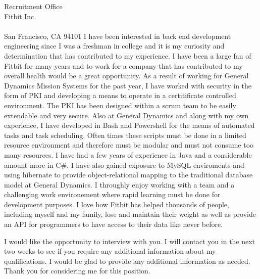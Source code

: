 \documentclass[11pt]{letter} %
\begin{document}
\begin{letter}{Recruitment Office\\
Fitbit Inc\\ \\
San Francisco, CA 94101}
I have been interested in back end development engineering since I was a freshman in college and it is my curiosity and determination that has contributed to my experience. I have been a large fan of Fitbit for many years and to work for a company that has contributed to my overall health would be a great opportunity. As a result of working for General Dynamics Mission Systems for the past year, I have worked with security in the form of PKI and developing a means to operate in a certitificate controlled environment. The PKI has been designed within a scrum team to be easily extendable and very secure. Also at General Dynamics and along with my own experience, I have developed in Bash and Powershell for the means of automated tasks and task scheduling. Often times these scripts must be done in a limited resource environment and therefore must be modular and must not consume too many resources. I have had a few years of experience in Java and a considerable amount more in C#. I have also gained exposure to MySQL enviroments and using hibernate to provide object-relational mapping to the traditional database model at General Dynamics. I throughly enjoy working with a team and a challenging work environement where rapid learning must be done for development purposes. I love how Fitbit has helped thousands of people, including myself and my family, lose and maintain their weight as well as provide an API for programmers to have access to their data like never before. 
 
I would like the opportunity to interview with you. I will contact you in the next two weeks to see if you require any additional information about my qualifications. I would be glad to provide any additional information as needed. Thank you for considering me for this position.


\end{letter}
\end{document}
